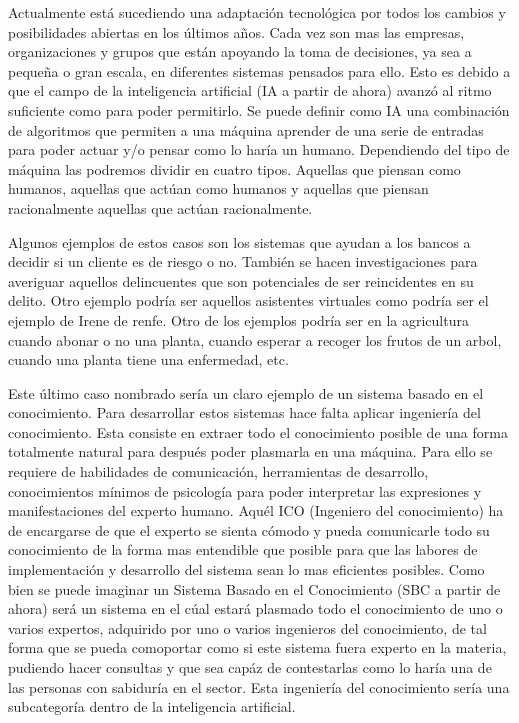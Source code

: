 \documentclass[11pt,a4paper,twoside,final]{article}
\begin{document}
Actualmente está sucediendo una adaptación tecnológica por todos los cambios y posibilidades abiertas en los últimos años.
Cada vez son mas las empresas, organizaciones y grupos que están apoyando la toma de decisiones, ya sea a pequeña o gran escala,
en diferentes sistemas pensados para ello. Esto es debido a que el campo de la inteligencia artificial (IA a partir de ahora)
avanzó al ritmo suficiente como para poder permitirlo. Se puede definir como IA una combinación de algoritmos que permiten a
 una máquina aprender de una serie de entradas para poder actuar y/o pensar como lo haría un humano. Dependiendo del tipo de máquina
 las podremos dividir en cuatro tipos. Aquellas que piensan como humanos, aquellas que actúan como humanos y aquellas que piensan racionalmente
 aquellas que actúan racionalmente.

\smallskip
Algunos ejemplos de estos casos son los sistemas que ayudan a los bancos a decidir si un cliente es de riesgo o no. También se hacen investigaciones
 para averiguar aquellos delincuentes que son potenciales de ser reincidentes en su delito. Otro ejemplo podría ser aquellos asistentes virtuales como
 podría ser el ejemplo de Irene de renfe. Otro de los ejemplos podría ser en la agricultura cuando abonar o no una planta, cuando esperar a
 recoger los frutos de un arbol, cuando una planta tiene una enfermedad, etc.


\bigskip
Este último caso nombrado sería un claro ejemplo de un sistema basado en el conocimiento. Para desarrollar estos sistemas hace falta aplicar ingeniería del conocimiento.
Esta consiste en extraer todo el conocimiento posible de una forma totalmente natural para después poder plasmarla en una máquina. Para ello se requiere de habilidades
 de comunicación, herramientas de desarrollo, conocimientos mínimos de psicología para poder interpretar las expresiones y manifestaciones del experto humano. Aquél ICO (Ingeniero del conocimiento)
 ha de encargarse de que el experto se sienta cómodo y pueda comunicarle todo su conocimiento de la forma mas entendible que posible para que las labores de implementación
 y desarrollo del sistema sean lo mas eficientes posibles. Como bien se puede imaginar un Sistema Basado en el Conocimiento (SBC a partir de ahora) será un sistema
 en el cúal estará plasmado todo el conocimiento de uno o varios expertos, adquirido por uno o varios ingenieros del conocimiento, de tal forma que se pueda comoportar
 como si este sistema fuera experto en la materia, pudiendo hacer consultas y que sea capáz de contestarlas como lo haría una de las personas con sabiduría en el sector.
 Esta ingeniería del conocimiento sería una subcategoría dentro de la inteligencia artificial.
\end{document}
